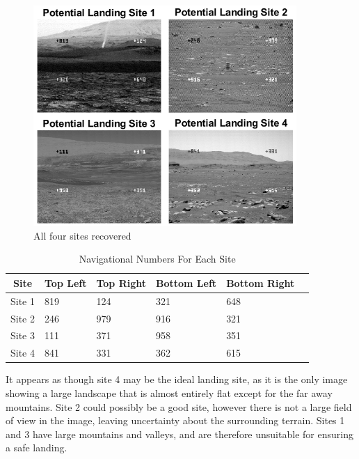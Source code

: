 \documentclass[12pt]{article}
\numberwithin{equation}{section}
\numberwithin{figure}{section}
\numberwithin{table}{section}
\begin{document}
\begin{figure}[ht]
    \centering
    \includegraphics[width=10cm]{figures/p2-landingsites.png}
    \caption{All four sites recovered\label{fig:p2-landingsites}}
\end{figure}
\begin{table}[ht]
    \small
    \caption{Navigational Numbers For Each Site\label{tab:p2-landingsites}}
    \begin{tabularx}{\textwidth}{c| *{5}{Y} }
        Site   & Top Left & Top Right & Bottom Left & Bottom Right \\
        \hline
        Site 1 & 819      & 124       & 321         & 648          \\
        Site 2 & 246      & 979       & 916         & 321          \\
        Site 3 & 111      & 371       & 958         & 351          \\
        Site 4 & 841      & 331       & 362         & 615
    \end{tabularx}
\end{table}

It appears as though site 4 may be the ideal landing site, as it is the only
image showing a large landscape that is almost entirely flat except for the far
away mountains. Site 2 could possibly be a good site, however there is not a
large field of view in the image, leaving uncertainty about the surrounding
terrain. Sites 1 and 3 have large mountains and valleys, and are therefore
unsuitable for ensuring a safe landing.

\pagebreak
%
%
\end{document}
